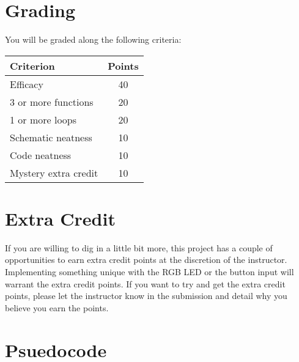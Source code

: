 \section*{Grading}
You will be graded along the following criteria:

\begin{table*}
    \begin{tabular}{ l | c }
        \toprule
        Criterion & Points \\

        \midrule
        Efficacy & 40 \\
        3 or more functions & 20 \\
        1 or more loops & 20 \\
        Schematic neatness & 10 \\
        Code neatness & 10 \\
        Mystery extra credit & 10 \\

        \bottomrule
    \end{tabular}
\end{table*}

\section*{Extra Credit}
If you are willing to dig in a little bit more, this project has a couple of opportunities to earn extra credit points at the discretion of the instructor.
Implementing something unique with the RGB LED or the button input will warrant the extra credit points.
If you want to try and get the extra credit points, please let the instructor know in the submission and detail why you believe you earn the points.

\section*{Psuedocode}

